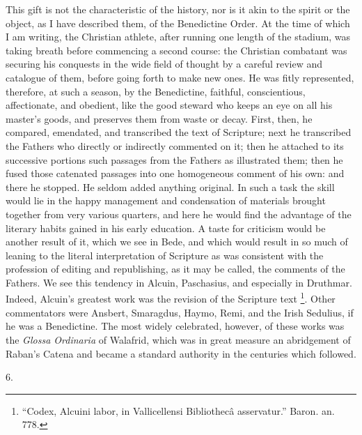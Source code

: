 This gift is not the characteristic of the history, nor is it akin
to the spirit or the object, as I have described them, of the
Benedictine Order. At the time of which I am writing, the Christian
athlete, after running one length of the stadium, was taking breath
before commencing a second course: the Christian combatant was
securing his conquests in the wide field of thought by a careful
review and catalogue of them, before going forth to make new ones. He
was fitly represented, therefore, at such a season, by the
Benedictine, faithful, conscientious, affectionate, and obedient, like
the good steward who keeps an eye on all his master's goods, and
preserves them from waste or decay. First, then, he compared,
emendated, and transcribed the text of Scripture; next he transcribed
the Fathers who directly or indirectly commented on it; then he
attached to its successive portions such passages from the Fathers as
illustrated them; then he fused those catenated passages into one
homogeneous comment of his own: and there he stopped. He seldom added
anything original. In such a task the skill would lie in the happy
management and condensation of materials brought together from very
various quarters, and here he would find the advantage of the literary
habits gained in his early education. A taste for criticism would be
another result of it, which we see in Bede, and which would result in
so much of leaning to the literal interpretation of Scripture as was
consistent with the profession of editing and republishing, as it may
be called, the comments of the Fathers. We see this tendency in Alcuin,
Paschasius, and especially in Druthmar. Indeed, Alcuin's greatest work
was the revision of the Scripture text \footnote{``Codex,
Alcuini labor, in Vallicellensi Bibliothecâ asservatur.'' Baron.
an. 778.}. Other commentators were Ansbert, Smaragdus, Haymo, Remi, and
the Irish Sedulius, if he was a Benedictine. The most widely
celebrated, however, of these works was the \emph{Glossa Ordinaria} of
Walafrid, which was in great measure an abridgement of Raban's Catena
and became a standard authority in the centuries which followed.

6.

